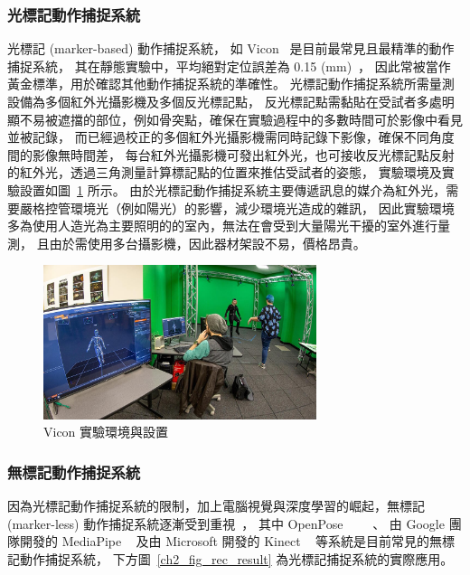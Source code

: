 \subsubsection{光標記動作捕捉系統}
光標記 (marker-based) 動作捕捉系統，
如 Vicon ~\cite{vicon_web}是目前最常見且最精準的動作捕捉系統，
其在靜態實驗中，平均絕對定位誤差為 0.15 (mm)~\cite{merriaux2017study}，
因此常被當作黃金標準，用於確認其他動作捕捉系統的準確性。
光標記動作捕捉系統所需量測設備為多個紅外光攝影機及多個反光標記點，
反光標記點需黏貼在受試者多處明顯不易被遮擋的部位，例如骨突點，確保在實驗過程中的多數時間可於影像中看見並被記錄，
而已經過校正的多個紅外光攝影機需同時記錄下影像，確保不同角度間的影像無時間差，
每台紅外光攝影機可發出紅外光，也可接收反光標記點反射的紅外光，透過三角測量計算標記點的位置來推估受試者的姿態，
實驗環境及實驗設置如圖~\ref{ch2_fig_OMC_Vicon} 所示。
由於光標記動作捕捉系統主要傳遞訊息的媒介為紅外光，需要嚴格控管環境光（例如陽光）的影響，減少環境光造成的雜訊，
因此實驗環境多為使用人造光為主要照明的的室內，無法在會受到大量陽光干擾的室外進行量測，
且由於需使用多台攝影機，因此器材架設不易，價格昂貴。

\begin{figure}[!ht]
    \centering
    \includegraphics[width=8cm]{figure/ch2_fig_OMC_Vicon.jpg}
     \caption[Vicon 實驗環境與設置]{Vicon 實驗環境與設置}
     \label{ch2_fig_OMC_Vicon}
\end{figure}

\subsubsection{無標記動作捕捉系統}
因為光標記動作捕捉系統的限制，加上電腦視覺與深度學習的崛起，無標記 (marker-less) 動作捕捉系統逐漸受到重視~\cite{sarafianos20163d}，
其中 OpenPose ~\cite{8765346}~\cite{wei2016cpm}~\cite{simon2017hand}~\cite{cao2017realtime}、
由 Google 團隊開發的 MediaPipe ~\cite{mediapipe_web} 及由 Microsoft 開發的 Kinect ~\cite{zhang2012microsoft} 等系統是目前常見的無標記動作捕捉系統，
下方圖~\ref{ch2_fig_rec_result} 為光標記捕捉系統的實際應用。 

